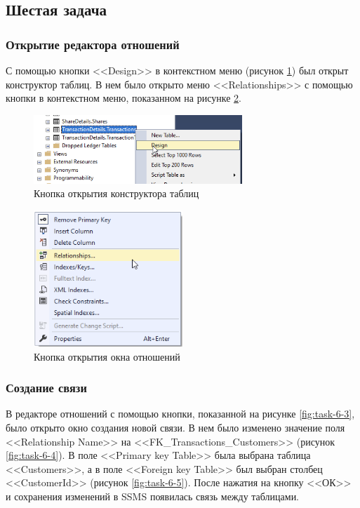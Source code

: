 \documentclass[a4paper, 14pt]{extarticle}
\begin{document}
\subsection{Шестая задача}

\subsubsection{Открытие редактора отношений}

С помощью кнопки <<Design>> в контекстном меню (рисунок \ref{fig:task-6-1}) был
открыт конструктор таблиц. В нем было открыто меню <<Relationships>> с помощью
кнопки в контекстном меню, показанном на рисунке \ref{fig:task-6-2}.

\begin{figure}[H]
  \centering
  \includegraphics[width=0.7\textwidth]{images/task-6/1.png}
  \caption{Кнопка открытия конструктора таблиц}
  \label{fig:task-6-1}
\end{figure}

\begin{figure}[H]
  \centering
  \includegraphics[width=0.5\textwidth]{images/task-6/2.png}
  \caption{Кнопка открытия окна отношений}
  \label{fig:task-6-2}
\end{figure}

\subsubsection{Создание связи}

В редакторе отношений с помощью кнопки, показанной на рисунке
\ref{fig:task-6-3}, было открыто окно создания новой связи. В нем было изменено
значение поля <<\foreignlanguage{english}{Relationship Name}>> на
<<FK\_Transactions\_Customers>> (рисунок \ref{fig:task-6-4}). В поле <<Primary
key Table>> была выбрана таблица <<Customers>>, а в поле <<Foreign key Table>>
был выбран столбец <<CustomerId>> (рисунок \ref{fig:task-6-5}). После нажатия на
кнопку <<ОК>> и сохранения изменений в SSMS появилась связь между таблицами.
\end{document}
